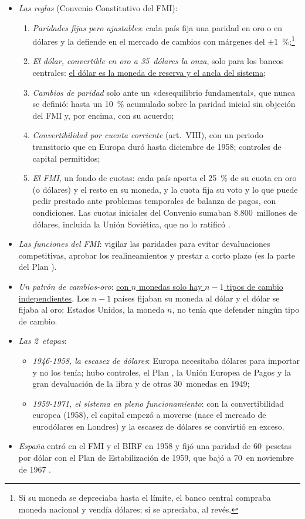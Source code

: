 \documentclass[11pt]{article}
\begin{document}
\begin{itemize}
\item \emph{Las reglas} (Convenio Constitutivo del FMI)\nocite{FMI1944Convenio}:
  \begin{enumerate}
  \item \emph{Paridades fijas pero ajustables}: cada país fija una paridad en oro o en dólares y la defiende en el mercado de cambios con márgenes del $\pm1$~\%;\footnote{Si su moneda se depreciaba hasta el límite, el banco central compraba moneda nacional y vendía dólares; si se apreciaba, al revés.}
  \item \emph{El dólar, convertible en oro a 35~dólares la onza}, solo para los bancos centrales: \uline{el dólar es la moneda de reserva y el ancla del sistema};
  \item \emph{Cambios de paridad} solo ante un «desequilibrio fundamental», que nunca se definió: hasta un 10~\% acumulado sobre la paridad inicial sin objeción del FMI y, por encima, con su acuerdo;
  \item \emph{Convertibilidad por cuenta corriente} (art.~VIII), con un periodo transitorio que en Europa duró hasta diciembre de 1958; controles de capital permitidos;
  \item \emph{El FMI}, un fondo de cuotas: cada país aporta el 25~\% de su cuota en oro (o dólares) y el resto en su moneda, y la cuota fija su voto y lo que puede pedir prestado ante problemas temporales de balanza de pagos, con condiciones\nocite{FMI1944Convenio}. Las cuotas iniciales del Convenio sumaban 8.800~millones de dólares, incluida la Unión Soviética, que no lo ratificó .
  \end{enumerate}
\item \emph{Las funciones del FMI}: vigilar las paridades para evitar devaluaciones competitivas, aprobar los realineamientos y prestar a corto plazo (es la parte del Plan ).
\item \emph{Un patrón de cambios-oro}: \uline{con $n$ monedas solo hay $n-1$ tipos de cambio independientes}. Los $n-1$ países fijaban su moneda al dólar y el dólar se fijaba al oro: Estados Unidos, la moneda $n$, no tenía que defender ningún tipo de cambio.
\item \emph{Las 2~etapas}:
  \begin{itemize}
  \item \emph{1946-1958, la escasez de dólares}: Europa necesitaba dólares para importar y no los tenía; hubo controles, el Plan , la Unión Europea de Pagos y la gran devaluación de la libra y de otras 30~monedas en 1949;
  \item \emph{1959-1971, el sistema en pleno funcionamiento}: con la convertibilidad europea (1958), el capital empezó a moverse (nace el mercado de eurodólares en Londres) y la escasez de dólares se convirtió en exceso.
  \end{itemize}
\item \emph{España} entró en el FMI y el BIRF en 1958 y fijó una paridad de 60~pesetas por dólar con el Plan de Estabilización de 1959, que bajó a 70~en noviembre de 1967 .
\end{itemize}
\end{document}
